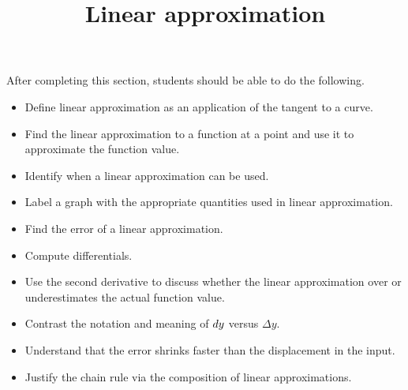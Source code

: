 \documentclass{ximera}
\title{Linear approximation}
\begin{document}
\begin{abstract}
\end{abstract}

\maketitle

\begin{sectionOutcomes}

After completing this section, students should be able to do the following.

\begin{itemize}
	\item Define linear approximation as an application of the tangent to a curve.
	\item Find the linear approximation to a function at a point and use it to approximate the function value.
	\item Identify when a linear approximation can be used.
	\item Label a graph with the appropriate quantities used in linear approximation.
	\item Find the error of a linear approximation.
        \item Compute differentials.
	\item Use the second derivative to discuss whether the linear approximation over or underestimates the actual function value.
	\item Contrast the notation and meaning of $\mathop{}\!d y$ versus $\Delta y$.
	\item Understand that the error shrinks faster than the displacement in the input.
        \item Justify the chain rule via the composition of linear approximations.
\end{itemize}

\end{sectionOutcomes}
\end{document}

